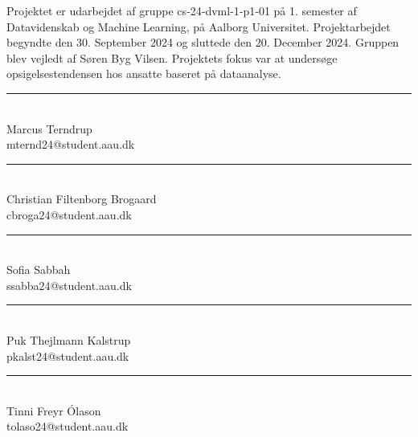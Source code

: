 
Projektet er udarbejdet af gruppe cs‐24‐dvml‐1‐p1‐01 på 1. semester af Datavidenskab og Machine Learning, på
Aalborg Universitet. Projektarbejdet begyndte den 30. September 2024 og sluttede den 20. December 2024.
Gruppen blev vejledt af Søren Byg Vilsen. Projektets fokus var at undersøge opsigelsestendensen hos ansatte baseret på dataanalyse. 

\vspace{40 mm} 
\begin{minipage}[b]{0.45\textwidth}
	\centering
	\rule{\textwidth}{0.5pt}\\
	Marcus Terndrup \\
	{\footnotesize mternd24@student.aau.dk
	}
\end{minipage}
\hfill
\vspace{40 mm}
\begin{minipage}[b]{0.45\textwidth}
	\centering
	\rule{\textwidth}{0.5pt}\\
	Christian Filtenborg Brogaard\\
	{\footnotesize cbroga24@student.aau.dk
	}
\end{minipage}
\hfill
\begin{minipage}[b]{0.45\textwidth}
	\centering
	\rule{\textwidth}{0.5pt}\\
	Sofia Sabbah \\
	{\footnotesize ssabba24@student.aau.dk
	}
\end{minipage}
\hfill
\begin{minipage}[b]{0.45\textwidth}
	\centering
	\rule{\textwidth}{0.5pt}\\
	Puk Thejlmann Kalstrup\\
	{\footnotesize pkalst24@student.aau.dk}
\end{minipage}
\hfill
\vspace{40 mm}
\begin{minipage}[b]{0.45\textwidth}
	\centering
	\rule{\textwidth}{0.5pt}\\
	Tinni Freyr Ólason\\
	{\footnotesize tolaso24@student.aau.dk
	}
\end{minipage}